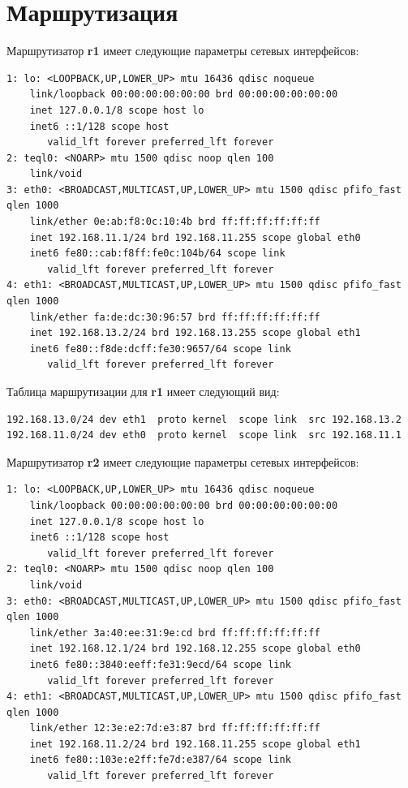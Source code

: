 \documentclass[a4paper,12pt]{article}
\begin{document}
\section{Маршрутизация}

Маршрутизатор \textbf{r1} имеет следующие параметры сетевых интерфейсов:

\begin{Verbatim}
1: lo: <LOOPBACK,UP,LOWER_UP> mtu 16436 qdisc noqueue 
    link/loopback 00:00:00:00:00:00 brd 00:00:00:00:00:00
    inet 127.0.0.1/8 scope host lo
    inet6 ::1/128 scope host 
       valid_lft forever preferred_lft forever
2: teql0: <NOARP> mtu 1500 qdisc noop qlen 100
    link/void 
3: eth0: <BROADCAST,MULTICAST,UP,LOWER_UP> mtu 1500 qdisc pfifo_fast qlen 1000
    link/ether 0e:ab:f8:0c:10:4b brd ff:ff:ff:ff:ff:ff
    inet 192.168.11.1/24 brd 192.168.11.255 scope global eth0
    inet6 fe80::cab:f8ff:fe0c:104b/64 scope link 
       valid_lft forever preferred_lft forever
4: eth1: <BROADCAST,MULTICAST,UP,LOWER_UP> mtu 1500 qdisc pfifo_fast qlen 1000
    link/ether fa:de:dc:30:96:57 brd ff:ff:ff:ff:ff:ff
    inet 192.168.13.2/24 brd 192.168.13.255 scope global eth1
    inet6 fe80::f8de:dcff:fe30:9657/64 scope link 
       valid_lft forever preferred_lft forever
\end{Verbatim}

Таблица маршрутизации для \textbf{r1} имеет следующий вид:

\begin{Verbatim}
192.168.13.0/24 dev eth1  proto kernel  scope link  src 192.168.13.2 
192.168.11.0/24 dev eth0  proto kernel  scope link  src 192.168.11.1
\end{Verbatim}

Маршрутизатор \textbf{r2} имеет следующие параметры сетевых интерфейсов:

\begin{Verbatim}
1: lo: <LOOPBACK,UP,LOWER_UP> mtu 16436 qdisc noqueue 
    link/loopback 00:00:00:00:00:00 brd 00:00:00:00:00:00
    inet 127.0.0.1/8 scope host lo
    inet6 ::1/128 scope host 
       valid_lft forever preferred_lft forever
2: teql0: <NOARP> mtu 1500 qdisc noop qlen 100
    link/void 
3: eth0: <BROADCAST,MULTICAST,UP,LOWER_UP> mtu 1500 qdisc pfifo_fast qlen 1000
    link/ether 3a:40:ee:31:9e:cd brd ff:ff:ff:ff:ff:ff
    inet 192.168.12.1/24 brd 192.168.12.255 scope global eth0
    inet6 fe80::3840:eeff:fe31:9ecd/64 scope link 
       valid_lft forever preferred_lft forever
4: eth1: <BROADCAST,MULTICAST,UP,LOWER_UP> mtu 1500 qdisc pfifo_fast qlen 1000
    link/ether 12:3e:e2:7d:e3:87 brd ff:ff:ff:ff:ff:ff
    inet 192.168.11.2/24 brd 192.168.11.255 scope global eth1
    inet6 fe80::103e:e2ff:fe7d:e387/64 scope link 
       valid_lft forever preferred_lft forever
\end{Verbatim}
\end{document}
